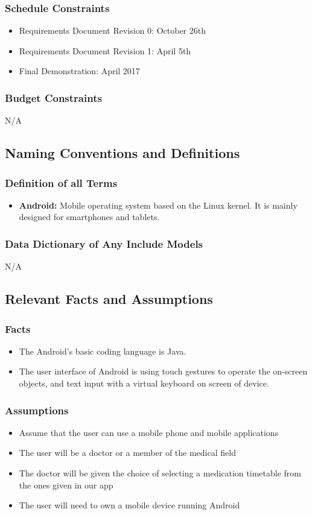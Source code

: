 \documentclass[12pt]{article}
\begin{document}
\subsubsection{Schedule Constraints}
\begin{itemize}
\item Requirements Document Revision 0: October 26th
\item Requirements Document Revision 1: April 5th
\item Final Demonstration: April 2017
\end{itemize}
\subsubsection{Budget Constraints}
N/A

\subsection{Naming Conventions and Definitions}
\subsubsection{Definition of all Terms}
\begin{itemize}
\item {\bf Android:} Mobile operating system based on the Linux kernel. It is mainly designed for smartphones and tablets. 
\end{itemize}
\subsubsection{Data Dictionary of Any Include Models}
N/A

\subsection{Relevant Facts and Assumptions}
\subsubsection{Facts}
\begin{itemize}
\item The Android's basic coding language is Java.
\item The user interface of Android is using touch gestures to operate the on-screen objects, and text input with a virtual keyboard on screen of device.
\end{itemize}
\subsubsection{Assumptions}
\begin{itemize}
\item Assume that the user can use a mobile phone and mobile applications
\item The user will be a doctor or a member of the medical field
\item The doctor will be given the choice of selecting a medication timetable from the ones given in our app
\item The user will need to own a mobile device running Android
\end{itemize}
\end{document}
